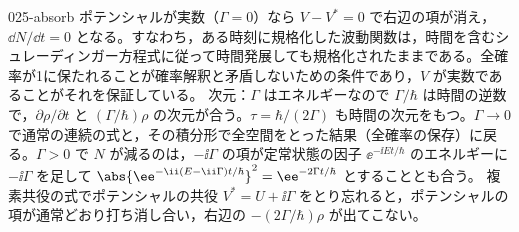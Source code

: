 \documentclass[uplatex,dvipdfmx,a4paper,11pt]{jsarticle}
\begin{document}
\begin{kaisetsu}{025-absorb}
ポテンシャルが実数（$\Gamma=0$）なら $V-V^{*}=0$ で右辺の項が消え，$\dd N/\dd t=0$ となる。すなわち，ある時刻に規格化した波動関数は，時間を含むシュレーディンガー方程式に従って時間発展しても規格化されたままである。全確率が1に保たれることが確率解釈と矛盾しないための条件であり，$V$ が実数であることがそれを保証している。
\kenzan 次元：$\Gamma$ はエネルギーなので $\Gamma/\hbar$ は時間の逆数で，$\partial\rho/\partial t$ と $(\Gamma/\hbar)\rho$ の次元が合う。$\tau=\hbar/(2\Gamma)$ も時間の次元をもつ。$\Gamma\to0$ で通常の連続の式と，その積分形で全空間をとった結果（全確率の保存）に戻る。$\Gamma>0$ で $N$ が減るのは，$-\ii\Gamma$ の項が定常状態の因子 $\ee^{-\ii Et/\hbar}$ のエネルギーに $-\ii\Gamma$ を足して $\abs{\ee^{-\ii(E-\ii\Gamma)t/\hbar}}^{2}=\ee^{-2\Gamma t/\hbar}$ とすることとも合う。
\tsumazuki 複素共役の式でポテンシャルの共役 $V^{*}=U+\ii\Gamma$ をとり忘れると，ポテンシャルの項が通常どおり打ち消し合い，右辺の $-(2\Gamma/\hbar)\rho$ が出てこない。
\end{kaisetsu}
\end{document}
